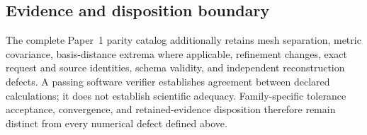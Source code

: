 \subsection{Evidence and disposition boundary}

The complete Paper~1 parity catalog additionally retains mesh separation, metric
covariance, basis-distance extrema where applicable, refinement changes, exact request
and source identities, schema validity, and independent reconstruction defects. A
passing software verifier establishes agreement between declared calculations; it does
not establish scientific adequacy. Family-specific tolerance acceptance, convergence,
and retained-evidence disposition therefore remain distinct from every numerical defect
defined above.
